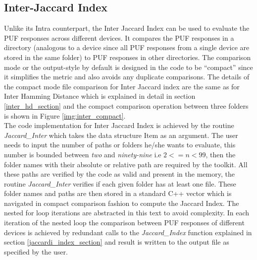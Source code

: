 \subsection{Inter-Jaccard Index}
Unlike its Intra counterpart, the Inter Jaccard Index can be used to evaluate the PUF responses across different devices. It compares the PUF responses in a directory (analogous to a device since all PUF responses from a single device are stored in the same folder) to PUF responses in other directories. The comparison mode or the output-style by default is designed in the code to be ``compact'' since it simplifies the metric and also avoids any duplicate comparisons. The details of
the compact mode file comparison for Inter Jaccard index are the same as for Inter Hamming Distance which is explained in detail in section \ref{inter_hd_section} and the  compact comparison operation between three folders is shown in Figure \ref{img:inter_compact}.\\

The code implementation for Inter Jaccard Index is achieved by the routine \emph{Jaccard\_Inter} which takes the data structure Item as an argument. The user needs to input the number of paths or folders he/she wants to evaluate, this number is bounded between \emph{two} and \emph{ninety-nine} i.e $2 <= n < 99$, then the folder names with their absolute or relative path are required by the toolkit. All these paths are verified by the code as valid and present in the memory, the
routine \emph{Jaccard\_Inter} verifies if each given folder has at least one file. These folder names and paths are then stored in a standard C++ vector which is navigated in compact comparison fashion to compute the Jaccard Index. The nested for loop iterations are abstracted in this text to avoid complexity. In each iteration of the nested loop the comparison between PUF responses of different devices is achieved by redundant calls to the \emph{Jaccard\_Index} function explained in section
\ref{jaccardi_index_section} and result is written to the output file as specified by the user.\\

